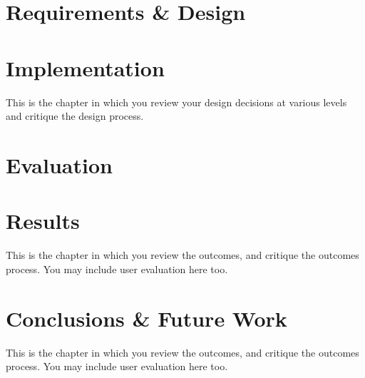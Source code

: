 \documentclass[11pt,openright,a4paper]{report}
\begin{document}
\chapter{Requirements \& Design}



\chapter{Implementation}
This is the chapter in which you review your design decisions at various
levels and critique the design process.


\chapter{Evaluation}


\chapter{Results}
This is the chapter in which you review the outcomes, and
critique the outcomes process.  You may include user evaluation here
too.

\chapter{Conclusions \& Future Work}
This is the chapter in which you review the outcomes, and
critique the outcomes process.  You may include user evaluation here
too.






\appendix




\end{document}
